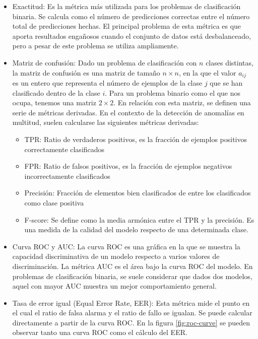 \documentclass[../main.tex]{memoir}
\begin{document}
\begin{itemize}
\item Exactitud: Es la métrica más utilizada para los problemas de
  clasificación binaria. Se calcula como el número de predicciones
  correctas entre el número total de predicciones hechas. El principal
  problema de esta métrica es que aporta resultados engañosos cuando
  el conjunto de datos está desbalanceado, pero a pesar de este problema
  se utiliza ampliamente.
\item Matriz de confusión: Dado un problema de clasificación con $n$
  clases distintas, la matriz de confusión es una matriz de tamaño
  $n \times n$, en la que el valor $a_{ij}$ es un entero que
  representa el número de ejemplos de la clase $j$ que se han
  clasificado dentro de la clase $i$. Para un problema binario como el
  que nos ocupa, tenemos una matriz $2 \times 2$.  En relación con
  esta matriz, se definen una serie de métricas derivadas. En el
  contexto de la detección de anomalías en multitud, suelen calcularse
  las siguientes métricas derivadas:
  \begin{itemize}
  \item TPR: Ratio de verdaderos positivos, es la fracción de ejemplos
    positivos correctamente clasificados
  \item FPR: Ratio de falsos positivos, es la fracción de ejemplos
    negativos incorrectamente clasificados
  \item Precisión: Fracción de elementos bien clasificados de entre
    los clasificados como clase positiva
  \item F-score: Se define como la media armónica entre el TPR y la
    precisión. Es una medida de la calidad del modelo respecto de una
    determinada clase.
  \end{itemize}
\item Curva ROC y AUC: La curva ROC es una gráfica en la que se
  muestra la capacidad discriminativa de un modelo respecto a varios
  valores de discriminación. La métrica AUC es el área bajo la curva
  ROC del modelo. En problemas de clasificación binaria, se suele
  considerar que dados dos modelos, aquel con mayor AUC muestra un
  mejor comportamiento general.
\item Tasa de error igual (Equal Error Rate, EER): Esta métrica mide
  el punto en el cual el ratio de falsa alarma y el ratio de fallo se
  igualan. Se puede calcular directamente a partir de la curva ROC. En
  la figura \ref{fig:roc-curve} se pueden observar tanto una curva
  ROC como el cálculo del EER.

\end{itemize}
\end{document}
